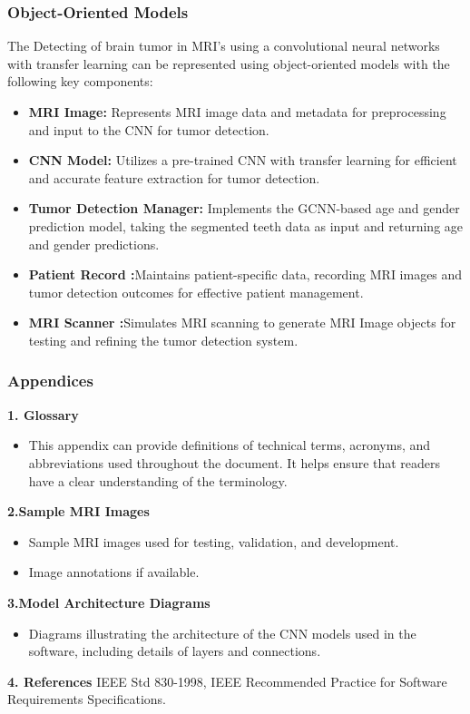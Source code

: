 \subsubsection{Object-Oriented Models}
 The Detecting of brain tumor in MRI’s using a convolutional neural networks with transfer learning can be represented using object-oriented models with the following key components:
\begin{itemize}
    \item \textbf{MRI Image:} Represents MRI image data and metadata for preprocessing and input to the CNN for tumor detection.
    \item \textbf{CNN Model:} Utilizes a pre-trained CNN with transfer learning for efficient and accurate feature extraction for tumor detection.
    \item \textbf{Tumor Detection Manager:} Implements the GCNN-based age and gender prediction model, taking the segmented teeth data as input and returning age and gender predictions.
    \item \textbf{Patient Record :}Maintains patient-specific data, recording MRI images and tumor detection outcomes for effective patient management.
    \item \textbf{MRI Scanner :}Simulates MRI scanning to generate MRI Image objects for testing and refining the tumor detection system.
\end{itemize}

\subsubsection{Appendices}
\textbf{1. Glossary}
\begin{itemize}
    \item This appendix can provide definitions of technical terms, acronyms, and abbreviations used throughout the document. It helps ensure that readers have a clear understanding of the terminology.
\end{itemize}
\textbf{2.Sample MRI Images}
\begin{itemize}
    \item Sample MRI images used for testing, validation, and development.
    \item Image annotations if available.

\end{itemize}
\textbf{3.Model Architecture Diagrams}
\begin{itemize}
    \item Diagrams illustrating the architecture of the CNN models used in the software, including details of layers and connections.
\end{itemize}
\textbf{4. References}
IEEE Std 830-1998, IEEE Recommended Practice for Software Requirements Specifications.






